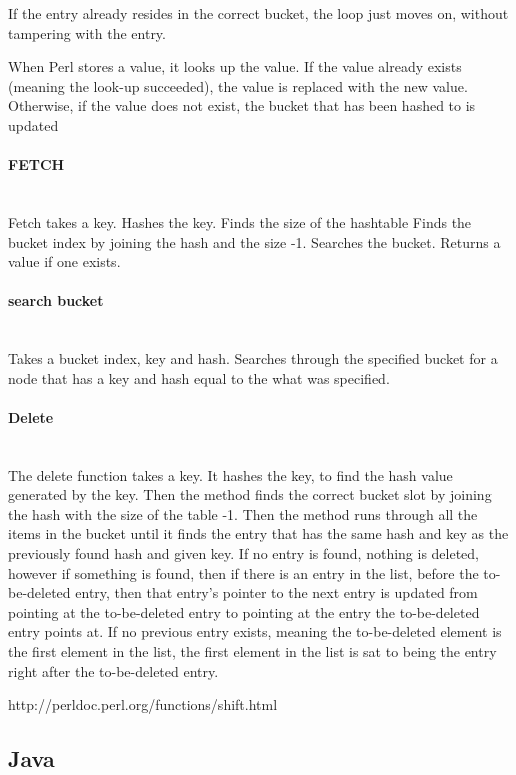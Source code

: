\documentclass[titlepage]{article}
\newcommand{\myparagraph}[1]{\paragraph{#1}\mbox{}\\}
\begin{document}
	If the entry already resides in the correct bucket, the loop just moves on, without tampering with the entry. 
	
	
	When Perl stores a value, it looks up the value. 
	If the value already exists (meaning the look-up succeeded), the value is replaced with the new value.
	Otherwise, if the value does not exist, the bucket that has been hashed to is updated
	
	\myparagraph{FETCH}
	Fetch takes a key. 
	Hashes the key.
	Finds the size of the hashtable
	Finds the bucket index by joining the hash and the size -1.
	Searches the bucket. Returns a value if one exists.
	
	\myparagraph{search bucket}
	Takes a bucket index, key and hash. 
	Searches through the specified bucket for a node that has a key and hash equal to the what was specified. 
	
	\myparagraph{Delete}
	The delete function takes a key. 
	It hashes the key, to find the hash value generated by the key.
	Then the method finds the correct bucket slot by joining the hash with the size of the table -1. 
	Then the method runs through all the items in the bucket until it finds the entry that has the same hash and key as the previously found hash and given key. 
	If no entry is found, nothing is deleted, however if something is found, then if there is an entry in the list, before the to-be-deleted entry, then that entry's pointer to the next entry is updated from pointing at the to-be-deleted entry to pointing at the entry the to-be-deleted entry points at. 
	If no previous entry exists, meaning the to-be-deleted element is the first element in the list, the first element in the list is sat to being the entry right after the to-be-deleted entry. 
	
	
	
	http://perldoc.perl.org/functions/shift.html
		
	
	\subsection{Java}
\end{document}
